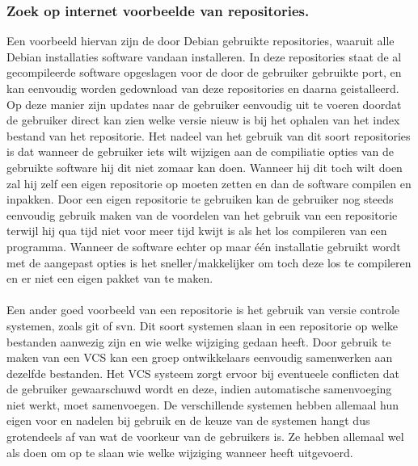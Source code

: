 \documentclass[a4paper,titlepage]{artikel1}
\begin{document}
   \subsubsection[Opdracht 6]{Zoek op internet voorbeelde van repositories.}
   Een voorbeeld hiervan zijn de door Debian gebruikte repositories, waaruit alle Debian installaties software vandaan installeren. In deze repositories staat de al gecompileerde software opgeslagen voor de door de gebruiker gebruikte port, en kan eenvoudig worden gedownload van deze repositories en daarna geistalleerd. Op deze manier zijn updates naar de gebruiker eenvoudig uit te voeren doordat de gebruiker direct kan zien welke versie nieuw is bij het ophalen van het index bestand van het repositorie. Het nadeel van het gebruik van dit soort repositories is dat wanneer de gebruiker iets wilt wijzigen aan de compiliatie opties van de gebruikte software hij dit niet zomaar kan doen. Wanneer hij dit toch wilt doen zal hij zelf een eigen repositorie op moeten zetten en dan de software compilen en inpakken. Door een eigen repositorie te gebruiken kan de gebruiker nog steeds eenvoudig gebruik maken van de voordelen van het gebruik van een repositorie terwijl hij qua tijd niet voor meer tijd kwijt is als het los compileren van een programma. Wanneer de software echter op maar \'{e}\'{e}n installatie gebruikt wordt met de aangepast opties is het sneller/makkelijker om toch deze los te compileren en er niet een eigen pakket van te maken. \\\\
   Een ander goed voorbeeld van een repositorie is het gebruik van versie controle systemen, zoals git of svn. Dit soort systemen slaan in een repositorie op welke bestanden aanwezig zijn en wie welke wijziging gedaan heeft. Door gebruik te maken van een VCS kan een groep ontwikkelaars eenvoudig samenwerken aan dezelfde bestanden. Het VCS systeem zorgt ervoor bij eventueele conflicten dat de gebruiker gewaarschuwd wordt en deze, indien automatische samenvoeging niet werkt, moet samenvoegen. De verschillende systemen hebben allemaal hun eigen voor en nadelen bij gebruik en de keuze van de systemen hangt dus grotendeels af van wat de voorkeur van de gebruikers is. Ze hebben allemaal wel als doen om op te slaan wie welke wijziging wanneer heeft uitgevoerd.
   
\end{document}
